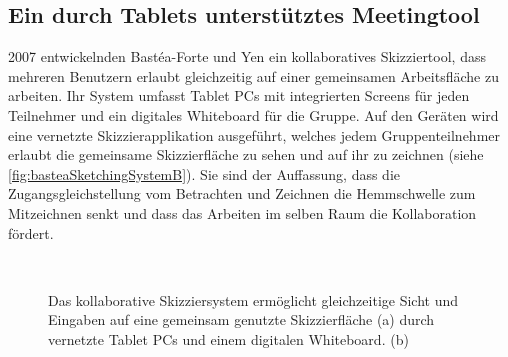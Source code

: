 \subsection{Ein durch Tablets unterstütztes Meetingtool}
2007 entwickelnden Bastéa-Forte und Yen ein kollaboratives Skizziertool, dass mehreren Benutzern erlaubt gleichzeitig auf einer gemeinsamen Arbeitsfläche zu arbeiten. Ihr System umfasst Tablet PCs mit integrierten Screens für jeden Teilnehmer und ein digitales Whiteboard für die Gruppe. Auf den Geräten wird eine vernetzte Skizzierapplikation ausgeführt, welches jedem Gruppenteilnehmer erlaubt die gemeinsame Skizzierfläche zu sehen und auf ihr zu zeichnen (siehe \autoref{fig:basteaSketchingSystemB}). Sie sind der Auffassung, dass die Zugangsgleichstellung vom Betrachten und Zeichnen die Hemmschwelle zum Mitzeichnen senkt und dass das Arbeiten im selben Raum die Kollaboration fördert. 

\begin{figure}
        \myfloatalign
         \quad
         \\
        \caption[Das kollaborative Skizziersystem \newline \citep{Bastea-Forte:2007}]{Das kollaborative Skizziersystem ermöglicht gleichzeitige Sicht und Eingaben auf eine gemeinsam genutzte Skizzierfläche (a) durch vernetzte Tablet PCs und einem digitalen Whiteboard. (b) }\label{fig:basteaSketchingSystemB}
\end{figure}

